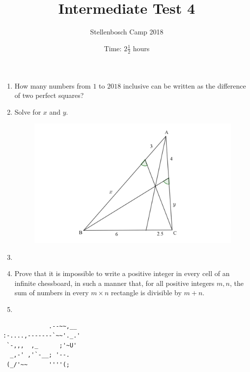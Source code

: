 \documentclass{article}
\title{Intermediate Test 4}
\author{Stellenbosch Camp 2018}
\date{Time: $2\frac{1}{2}$ hours}
\begin{document}
\maketitle

\begin{enumerate}[1.]

\item %
How many numbers from $1$ to $2018$ inclusive can be written as the difference of two perfect squares?


\vspace{12pt}
\item %
Solve for $x$ and $y$. 

\begin{figure}[H]
\centering
\includegraphics[width=0.9\linewidth]{GeogebraTest4.png}
\end{figure}


\vspace{12pt}
\item %


\vspace{12pt}
\item %
Prove that it is impossible to write a positive integer in every cell of an infinite chessboard, in such a manner that, for all positive integers $m, n$, the sum of numbers in every $m\times n$ rectangle is divisible by $m + n$.


\vspace{12pt}
\item %


\end{enumerate}


\vfill
\centering
\begin{BVerbatim}
             .--~~,__
:-....,-------`~~'._.'
 `-,,,  ,_      ;'~U'
  _,-' ,'`-__; '--.
 (_/'~~      ''''(;
\end{BVerbatim}
\end{document}
